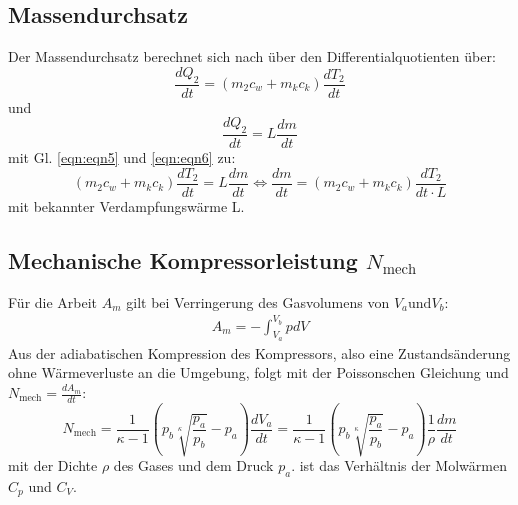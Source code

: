 \subsection{Massendurchsatz}
\label{sec:Massendurchsatz}
Der Massendurchsatz berechnet sich nach \cite{AnleitungV206} über den Differentialquotienten über:
\begin{equation}
  \frac{dQ_2}{dt} = (m_2c_w + m_kc_k) \frac{dT_2}{dt}
  \label{eqn:eqn5}
\end{equation}
und
\begin{equation}
  \frac{dQ_2}{dt} = L \frac{dm}{dt}
  \label{eqn:eqn6}
\end{equation}
mit Gl. \ref{eqn:eqn5} und \ref{eqn:eqn6} zu:
\begin{equation}
  (m_2c_w + m_kc_k) \frac{dT_2}{dt} = L \frac{dm}{dt} \Leftrightarrow  \frac{dm}{dt} = (m_2c_w + m_kc_k) \frac{dT_2}{dt \cdot L}
  \label{eqn:eqn7}
\end{equation}
mit bekannter Verdampfungswärme L.

\subsection{Mechanische Kompressorleistung $N_\text{mech}$}
\label{sec:Kompleistung}
Für die Arbeit $A_m$ gilt bei Verringerung des Gasvolumens von $V_a \textrm{und} V_b$:
\begin{align}
  A_m = - \int_{V_a}^{V_b} pdV
  \label{eqn:eqn8}
\end{align}
Aus der adiabatischen Kompression des Kompressors, also eine Zustandsänderung ohne Wärmeverluste an die Umgebung, folgt mit der Poissonschen Gleichung und $N_\text{mech} = \frac{dA_m}{dt}$:
\begin{equation}
  N_\text{mech} = \frac{1}{\kappa - 1} \left( p_b \sqrt[\kappa]{\frac{p_a}{p_b}} - p_a \right) \frac{dV_a}{dt} = \frac{1}{\kappa - 1} \left( p_b \sqrt[\kappa]{\frac{p_a}{p_b}} - p_a \right) \frac{1}{\rho} \frac{dm}{dt}
  \label{eqn:eqn9}
\end{equation}
mit der Dichte $\rho$ des Gases und dem Druck $p_a$.
\kappa ist das Verhältnis der Molwärmen $C_p$ und $C_V$.
